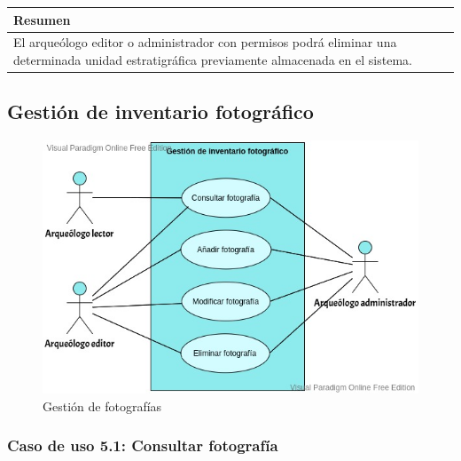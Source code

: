     \begin{table}[H]
        \centering
        \begin{tabularx}{\textwidth}{@{} |L |@{}} \hline
            \textbf{Resumen} \\
            \hline
            El arqueólogo editor o administrador con permisos podrá eliminar una determinada
            unidad estratigráfica previamente almacenada en el sistema. \\
            \hline
        \end{tabularx}
    \end{table}

\subsection{Gestión de inventario fotográfico}
    \begin{figure}[H]
        \centering
        \includegraphics[scale=0.50]{imagenes/diagramas CU/photo-UC.jpeg}
        \caption{Gestión de fotografías}
        \label{fig:photo-management}
    \end{figure}

\subsubsection{Caso de uso 5.1: Consultar fotografía}

